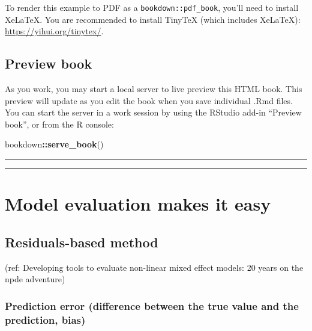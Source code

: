 \documentclass[
]{book}
\newenvironment{Shaded}{\begin{snugshade}}{\end{snugshade}}
\newcommand{\FunctionTok}[1]{\textcolor[rgb]{0.13,0.29,0.53}{\textbf{#1}}}
\newcommand{\NormalTok}[1]{#1}
\newcommand{\SpecialCharTok}[1]{\textcolor[rgb]{0.81,0.36,0.00}{\textbf{#1}}}
\begin{document}
To render this example to PDF as a \texttt{bookdown::pdf\_book}, you'll need to install XeLaTeX. You are recommended to install TinyTeX (which includes XeLaTeX): \url{https://yihui.org/tinytex/}.

\hypertarget{preview-book}{%
\section{Preview book}\label{preview-book}}

As you work, you may start a local server to live preview this HTML book. This preview will update as you edit the book when you save individual .Rmd files. You can start the server in a work session by using the RStudio add-in ``Preview book'', or from the R console:

\begin{Shaded}
\begin{Highlighting}[]
\NormalTok{bookdown}\SpecialCharTok{::}\FunctionTok{serve\_book}\NormalTok{()}
\end{Highlighting}
\end{Shaded}

\begin{center}\rule{0.5\linewidth}{0.5pt}\end{center}

\begin{center}\rule{0.5\linewidth}{0.5pt}\end{center}

\hypertarget{model-evaluation-makes-it-easy}{%
\chapter{Model evaluation makes it easy}\label{model-evaluation-makes-it-easy}}

\hypertarget{residuals-based-method}{%
\section{Residuals-based method}\label{residuals-based-method}}

(ref: Developing tools to evaluate non-linear mixed effect models: 20 years on the npde adventure)

\hypertarget{prediction-error-difference-between-the-true-value-and-the-prediction-bias}{%
\subsection{Prediction error (difference between the true value and the prediction, bias)}\label{prediction-error-difference-between-the-true-value-and-the-prediction-bias}}
\end{document}

